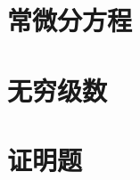 \documentclass[12pt, a4paper, oneside, UTF8]{ctexbook}
\begin{document}
\section{常微分方程}

\section{无穷级数}


\section{证明题}
\ifx\allfiles\undefined
\end{document}
